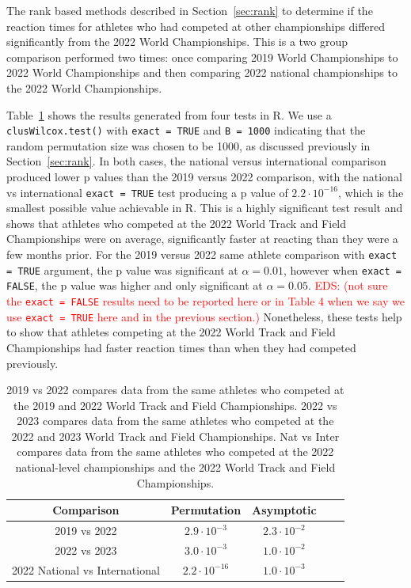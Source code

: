 \documentclass[12pt, letterpaper, titlepage]{article}
\newcommand{\eds}[1]{\textcolor{red}{EDS: (#1)}}
\begin{document}
The rank based methods described in Section~\ref{sec:rank}
to determine if the reaction times for athletes who had competed at other 
championships differed significantly from the 2022 World Championships.  This is
a two group comparison performed two times: once comparing 2019 World
Championships to 2022 World Championships and then comparing 2022 national
championships to the 2022 World Championships.



Table~\ref{tab:Clusrankresults} shows the results generated from four tests in R.
We use a \texttt{clusWilcox.test()} with \texttt{exact = TRUE} and 
\texttt{B = 1000} indicating that the random permutation size was chosen to be 
1000, as discussed previously in Section~\ref{sec:rank}.  
In both cases, the national versus international comparison
produced lower p values than the 2019 versus 2022 comparison, with the
national vs international \texttt{exact = TRUE} test producing a p value of 
$2.2\cdot10^{-16}$, which is the smallest possible value achievable in R.  This
is a highly significant test result and shows that athletes who competed at the
2022 World Track and Field Championships were on average, significantly faster
at reacting than they were a few months prior.  For the 2019 versus 2022
same athlete comparison with \texttt{exact = TRUE} argument, the p value was
significant at $\alpha = 0.01$, however when \texttt{exact = FALSE}, the p
value was higher and only significant at $\alpha = 0.05$. 
\eds{not sure the \texttt{exact = FALSE} results need to be reported here or in
Table 4 when we say we use \texttt{exact = TRUE} here and in the previous section.}
Nonetheless, these
tests help to show that athletes competing at the 2022 World Track and Field
Championships had faster reaction times than when they had competed previously.

\begin{table}
  \centering
  \caption{}
  \begin{tabular}{c c c c c} 
   \toprule
   Comparison & Permutation & Asymptotic \\ 
   \midrule
   2019 vs 2022 & $2.9\cdot10^{-3}$ & $2.3\cdot10^{-2}$ \\
   2022 vs 2023 & $3.0\cdot10^{-3}$ & $1.0\cdot10^{-2}$ \\
   2022 National vs International & $2.2\cdot10^{-16}$ & $1.0\cdot10^{-3}$ \\
   \bottomrule
  \end{tabular}
  \caption{2019 vs 2022 compares data from the same athletes who competed at the
  2019 and 2022 World Track and Field Championships. 2022 vs 2023 compares data
  from the same athletes who competed at the 2022 and 2023 World Track and Field
  Championships. Nat vs Inter compares data from the same athletes who competed
  at the 2022 national-level championships and the 2022 World Track and Field
  Championships.}
  \label{tab:Clusrankresults}
\end{table}
\end{document}
